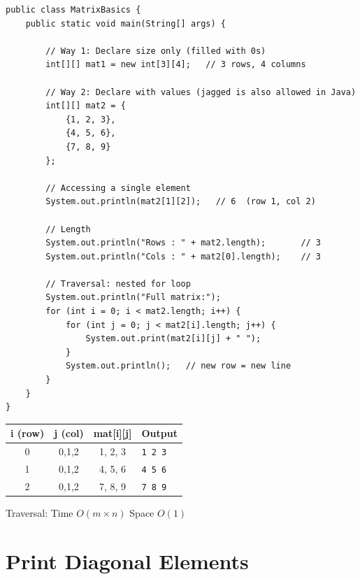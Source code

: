 \documentclass[12pt,a4paper,oneside]{book}
\begin{document}
\begin{lstlisting}[caption={Declaring, initialising, and traversing a 2-D array}]
public class MatrixBasics {
    public static void main(String[] args) {

        // Way 1: Declare size only (filled with 0s)
        int[][] mat1 = new int[3][4];   // 3 rows, 4 columns

        // Way 2: Declare with values (jagged is also allowed in Java)
        int[][] mat2 = {
            {1, 2, 3},
            {4, 5, 6},
            {7, 8, 9}
        };

        // Accessing a single element
        System.out.println(mat2[1][2]);   // 6  (row 1, col 2)

        // Length
        System.out.println("Rows : " + mat2.length);       // 3
        System.out.println("Cols : " + mat2[0].length);    // 3

        // Traversal: nested for loop
        System.out.println("Full matrix:");
        for (int i = 0; i < mat2.length; i++) {
            for (int j = 0; j < mat2[i].length; j++) {
                System.out.print(mat2[i][j] + " ");
            }
            System.out.println();   // new row = new line
        }
    }
}
\end{lstlisting}

\begin{dryrun}
\begin{center}
\begin{tabular}{cccl}
\toprule
\textbf{i (row)} & \textbf{j (col)} & \textbf{mat[i][j]} & \textbf{Output}\\
\midrule
0 & 0,1,2 & 1, 2, 3 & \texttt{1 2 3}\\
1 & 0,1,2 & 4, 5, 6 & \texttt{4 5 6}\\
2 & 0,1,2 & 7, 8, 9 & \texttt{7 8 9}\\
\bottomrule
\end{tabular}
\end{center}
\end{dryrun}

\begin{complexity}
Traversal: Time $O(m \times n)$ \quad Space $O(1)$
\end{complexity}

\section{Print Diagonal Elements}
\end{document}
